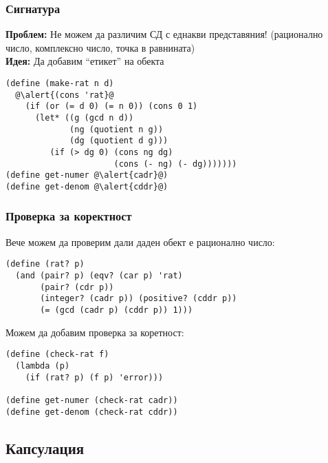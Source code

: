 \documentclass[alsotrans]{beamerswitch}
\begin{document}
\begin{frame}[fragile]
  \frametitle{Сигнатура}

  \textbf{Проблем:} Не можем да различим СД с еднакви представяния! (рационално число, комплексно число, точка в равнината)\\
  \pause
  \textbf{Идея:} Да добавим ``етикет'' на обекта
  \small
  \begin{center}
  \end{center}
  \pause
  \vspace{-.5ex}
\begin{lstlisting}
(define (make-rat n d)
  @\alert{(cons 'rat}@
    (if (or (= d 0) (= n 0)) (cons 0 1)
      (let* ((g (gcd n d))
             (ng (quotient n g))
             (dg (quotient d g)))
         (if (> dg 0) (cons ng dg)
                      (cons (- ng) (- dg)))))))
(define get-numer @\alert{cadr}@)
(define get-denom @\alert{cddr}@)
\end{lstlisting}
\end{frame}

\begin{frame}[fragile]
  \frametitle{Проверка за коректност}

  Вече можем да проверим дали даден обект е рационално число:
\begin{lstlisting}
(define (rat? p)
  (and (pair? p) (eqv? (car p) 'rat)
       (pair? (cdr p))
       (integer? (cadr p)) (positive? (cddr p))
       (= (gcd (cadr p) (cddr p)) 1)))
\end{lstlisting}
  \pause
  Можем да добавим проверка за коретност:
\begin{lstlisting}
(define (check-rat f)
  (lambda (p)
    (if (rat? p) (f p) 'error)))

(define get-numer (check-rat cadr))
(define get-denom (check-rat cddr))
\end{lstlisting}
\end{frame}

\subsection{Капсулация}
\end{document}
